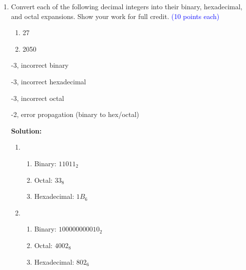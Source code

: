 \documentclass{article}
\newcommand{\pte}[1]{\textcolor{blue}{(#1 points each)}}
\newenvironment{solution}
{
\par
\color{blue}
\textbf{Solution:}
}
{
\par
}
\newenvironment{rubric}
{
\par
\begin{spacing}{.6}
\begin{itshape}
\color{red}

}
{
\end{itshape}
\end{spacing}
\par
}
\begin{document}
\begin{enumerate}
\begin{rubric}
-2, arithmetic error

-4, no work shown

-5, incorrect
\end{rubric}

\vspace{2mm}
\begin{solution}
\begin{enumerate}
    \item $x=2,7$
    \item $x=7$
    \item $x=5$
    \item $x=5$
\end{enumerate}
\end{solution}

\item Convert each of the following decimal integers into their binary, hexadecimal, and octal expansions. Show your work for full credit. \pte{10}
\begin{enumerate}
    \item 27
    \item 2050
\end{enumerate}

\begin{rubric}
-3, incorrect binary

-3, incorrect hexadecimal

-3, incorrect octal

-2, error propagation (binary to hex/octal)
\end{rubric}

\vspace{2mm}
\begin{solution}
\begin{enumerate}
    \item \begin{enumerate}
        \item Binary: $11011_2$
        \item Octal: $33_8$
        \item Hexadecimal: $1B_6$
    \end{enumerate}
    \item \begin{enumerate}
        \item Binary: $100000000010_2$
        \item Octal: $4002_8$
        \item Hexadecimal: $802_6$
    \end{enumerate}
\end{enumerate}
\end{solution}


\end{enumerate}
\end{document}
